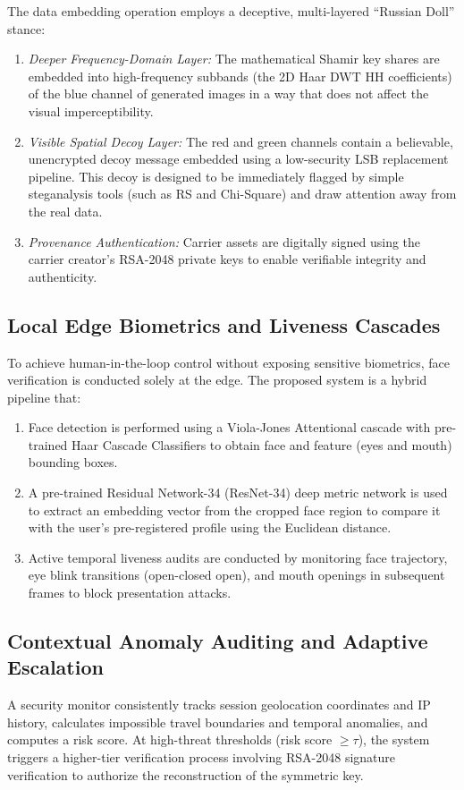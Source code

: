 \documentclass[conference]{IEEEtran}
\begin{document}
The data embedding operation employs a deceptive, multi-layered ``Russian Doll'' stance:
\begin{enumerate}
\item \textit{Deeper Frequency-Domain Layer:} The mathematical Shamir key shares are embedded into high-frequency subbands (the 2D Haar DWT HH coefficients) of the blue channel of generated images in a way that does not affect the visual imperceptibility.
\item \textit{Visible Spatial Decoy Layer:} The red and green channels contain a believable, unencrypted decoy message embedded using a low-security LSB replacement pipeline. This decoy is designed to be immediately flagged by simple steganalysis tools (such as RS and Chi-Square) and draw attention away from the real data.
\item \textit{Provenance Authentication:} Carrier assets are digitally signed using the carrier creator's RSA-2048 private keys to enable verifiable integrity and authenticity.
\end{enumerate}

\subsection{Local Edge Biometrics and Liveness Cascades}
To achieve human-in-the-loop control without exposing sensitive biometrics, face verification is conducted solely at the edge. The proposed system is a hybrid pipeline that:
\begin{enumerate}
\item Face detection is performed using a Viola-Jones Attentional cascade with pre-trained Haar Cascade Classifiers to obtain face and feature (eyes and mouth) bounding boxes.
\item A pre-trained Residual Network-34 (ResNet-34) deep metric network is used to extract an embedding vector from the cropped face region to compare it with the user's pre-registered profile using the Euclidean distance.
\item Active temporal liveness audits are conducted by monitoring face trajectory, eye blink transitions (open-closed open), and mouth openings in subsequent frames to block presentation attacks.
\end{enumerate}

\subsection{Contextual Anomaly Auditing and Adaptive Escalation}
A security monitor consistently tracks session geolocation coordinates and IP history, calculates impossible travel boundaries and temporal anomalies, and computes a risk score. At high-threat thresholds (risk score $\ge \tau$), the system triggers a higher-tier verification process involving RSA-2048 signature verification to authorize the reconstruction of the symmetric key.
\end{document}
